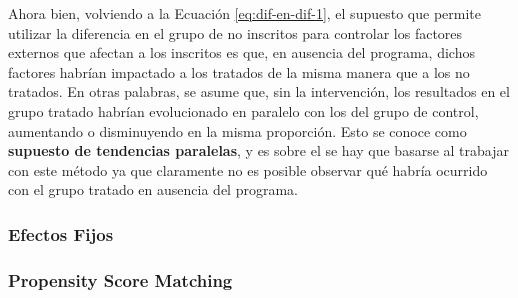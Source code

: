 \documentclass[../../main.tex]{subfiles}
\begin{document}
Ahora bien, volviendo a la Ecuación \ref{eq:dif-en-dif-1}, el supuesto que permite utilizar la diferencia en el grupo de no inscritos para controlar los factores externos que afectan a los inscritos es que, en ausencia del programa, dichos factores habrían impactado a los tratados de la misma manera que a los no tratados. En otras palabras, se asume que, sin la intervención, los resultados en el grupo tratado habrían evolucionado en paralelo con los del grupo de control, aumentando o disminuyendo en la misma proporción. Esto se conoce como \textbf{supuesto de tendencias paralelas}, y es sobre el se hay que basarse al trabajar con este método ya que claramente no es posible observar qué habría ocurrido con el grupo tratado en ausencia del programa.



\subsubsection{Efectos Fijos}

\subsubsection{Propensity Score Matching}

\end{document}
